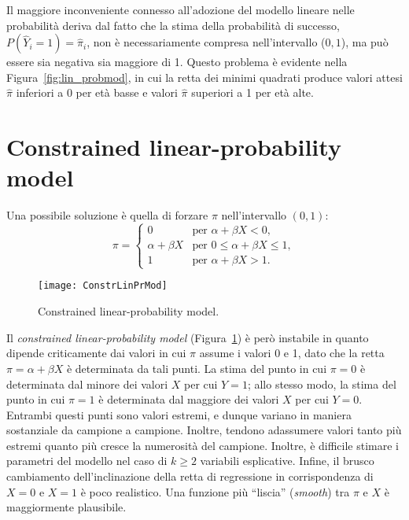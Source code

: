 Il maggiore inconveniente connesso all'adozione del modello lineare nelle probabilità deriva dal fatto che la stima della probabilità di successo, $P(\hat{Y}_i=1)=\hat{\pi}_i$, non è necessariamente compresa nell'intervallo ($0,1$), ma può essere sia negativa sia maggiore di 1. 
Questo problema è evidente nella Figura~\ref{fig:lin_probmod}, in cui la retta dei minimi quadrati produce valori attesi $\hat{\pi}$ inferiori a 0 per età basse e valori $\hat{\pi}$ superiori a 1 per età alte.

\section{Constrained linear-probability model}

Una possibile soluzione è quella di forzare $\pi$ nell'intervallo $(0, 1)$:
\[
\pi=
\begin{cases}
  0                           &\text{per $\alpha + \beta X$} < 0,\\
  \alpha + \beta X           &\text{per $0 \leq \alpha + \beta X \leq 1$},\\
  1 &\text{per $\alpha + \beta X > 1$.}
\end{cases}
\]

\begin{figure}[h!]
  \begin{center}
    \texttt{[image: ConstrLinPrMod]}
  \end{center}
\caption{Constrained linear-probability model.}
\label{fig:constrained_linprobmod}
\end{figure}

\noindent
Il \emph{constrained linear-probability model} (Figura~\ref{fig:constrained_linprobmod}) è però instabile in quanto dipende criticamente dai valori in cui $\pi$ assume i valori 0 e 1, dato che la retta $\pi = \alpha + \beta X$ è determinata da tali punti.
La stima del punto in cui $\pi = 0$ {\`e} determinata dal minore dei valori $X$ per cui $Y=1$;  allo stesso modo, la stima del punto in cui $\pi = 1$ è determinata dal maggiore dei valori $X$ per cui $Y=0$. Entrambi questi punti sono valori estremi, e dunque variano in
maniera sostanziale da campione a campione.  Inoltre, tendono adassumere valori tanto pi{\`u} estremi quanto pi{\`u} cresce la numerosità del campione. Inoltre, è difficile stimare i parametri del modello nel caso di $k \geq 2$ variabili esplicative. Infine, il brusco cambiamento dell'inclinazione della retta di  regressione in corrispondenza di $X=0$ e $X=1$ è poco realistico. Una funzione più ``liscia'' (\emph{smooth}) tra $\pi$ e $X$ è maggiormente plausibile.

